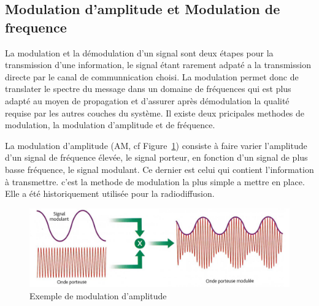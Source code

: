 \documentclass[12pt]{article}
\begin{document}
\subsection{Modulation d'amplitude et Modulation de frequence}
La modulation et la démodulation d'un signal sont deux étapes pour la transmission d'une information, le signal étant rarement adpaté a la transmission directe par le canal de communnication choisi.
La modulation permet donc de translater le spectre du message
dans un domaine de fréquences
qui est plus adapté au moyen de propagation et d'assurer après démodulation la qualité requise par les autres couches du système. Il existe deux pricipales methodes de modulation, la modulation d'amplitude et de fréquence.

La modulation d'amplitude (AM, cf Figure~\ref{fig:modAmp}) consiste à faire varier l'amplitude d'un signal de fréquence élevée, le signal porteur, en fonction d'un signal de plus basse fréquence, le signal modulant. Ce dernier est celui qui contient l'information à transmettre. c'est la methode de modulation la plus simple a mettre en place. Elle a été historiquement utilisée pour la radiodiffusion.
\begin{figure}[H]
\begin{center}
\caption{Exemple de modulation d'amplitude}
\label{fig:modAmp}
\includegraphics[scale=0.30]{modAmp.jpg}
\end{center}
\end{figure}
\end{document}
